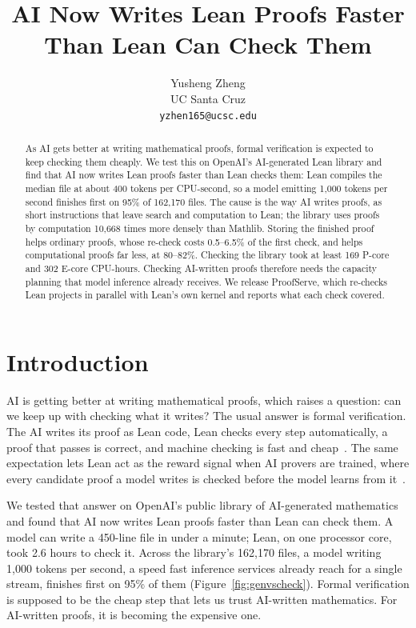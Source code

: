 \documentclass[10pt,twocolumn]{article}
\title{AI Now Writes Lean Proofs Faster Than Lean Can Check Them}
\author{Yusheng Zheng\\UC Santa Cruz\\\texttt{yzhen165@ucsc.edu}}
\date{}
\begin{document}
\maketitle
\begin{abstract}
As AI gets better at writing mathematical proofs, formal verification is
expected to keep checking them cheaply. We test this on OpenAI's
AI-generated Lean library and find that AI now writes Lean proofs faster
than Lean checks them: Lean compiles the median file at about 400 tokens
per CPU-second, so a model emitting 1,000 tokens per second finishes first
on 95\% of 162,170 files. The cause is the way AI writes proofs, as short
instructions that leave search and computation to Lean; the library uses
proofs by computation 10,668 times more densely than Mathlib. Storing the
finished proof helps ordinary proofs, whose re-check costs 0.5--6.5\% of
the first check, and helps computational proofs far less, at 80--82\%.
Checking the library took at least 169 P-core and 302 E-core CPU-hours.
Checking AI-written proofs therefore needs the capacity planning that model
inference already receives. We release ProofServe, which re-checks Lean
projects in parallel with Lean's own kernel and reports what each check
covered.
\end{abstract}

\section{Introduction}
AI is getting better at writing mathematical proofs, which raises a
question: can we keep up with checking what it writes? The usual answer is
formal verification. The AI writes its proof as Lean code, Lean checks
every step automatically, a proof that passes is correct, and machine
checking is fast and cheap~\cite{lean4}. The same expectation lets Lean act
as the reward signal when AI provers are trained, where every candidate
proof a model writes is checked before the model learns from
it~\cite{deepseekVerifierArtifact,kiminaPaper}.

We tested that answer on OpenAI's public library of AI-generated
mathematics~\cite{openaiMathSource} and found that AI now writes Lean
proofs faster than Lean can check them. A model can write a 450-line file
in under a minute; Lean, on one processor core, took 2.6 hours to check it.
Across the library's 162,170 files, a model writing 1,000 tokens per second,
a speed fast inference services already reach for a single stream,
finishes first on 95\% of them (Figure~\ref{fig:genvscheck}). Formal
verification is supposed to be the cheap step that lets us trust
AI-written mathematics. For AI-written proofs, it is becoming the expensive
one.
\end{document}
